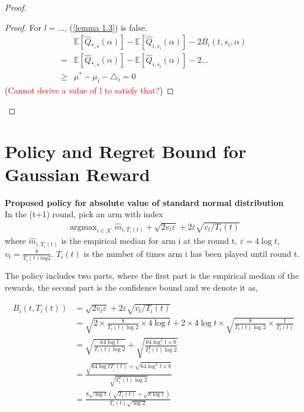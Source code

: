 \documentclass{article}
\DeclareMathOperator*{\argmax}{argmax}
\theoremstyle{plain}
\begin{document}
\begin{proof}
\begin{proof}
    For $l = ...$, (\ref{lemma 1.3}) is false.
    \begin{align}
        & \mathbb{E}[\hat{Q}_{*, s}(\alpha)] - \mathbb{E}[\hat{Q}_{i, s_i}(\alpha)] - 2 B_i(t, s_i, \alpha) \\
        = &\mathbb{E}[\hat{Q}_{*, s}(\alpha)] - \mathbb{E}[\hat{Q}_{i, s_i}(\alpha)] - 2 ... \\
        \geq & \mu^\ast - \mu_i - \triangle_i = 0
    \end{align}
    (\textcolor{red}{Cannot derive a value of l to satisfy that?})
\end{proof}
   
\end{proof}


\section{Policy and Regret Bound for Gaussian Reward}

\textbf{Proposed policy for absolute value of standard normal distribution}\\
In the (t+1) round, pick an arm with index 
\begin{align}
\label{policy normal}
   \argmax_{i \in \mathcal{K}} \hat{m}_{i, T_i(t)} + \sqrt{2v_t \varepsilon} + 2 \varepsilon \sqrt{v_t/T_i(t)}
\end{align}
where $\hat{m}_{i, T_i(t)}$ is the empirical median for arm i at the round t, $\varepsilon = 4 \log t$, $v_t = \frac{8}{T_i(t) log2}$. $T_i(t)$ is the number of times arm i has been played until round t.  

The policy includes two parts, where the first part is the empirical median of the rewards, the second part is the confidence bound and we denote it as,

\begin{align}
\label{B_i(i, T_i(t)) definition}
B_i(t, T_i(t)) &= \sqrt{2v_t \varepsilon} + 2 \varepsilon \sqrt{v_t/T_i(t)}\\
&= \sqrt{2 \times \frac{8}{T_i(t) \log 2} \times 4 \log t} + 2 \times 4 \log t \times \sqrt{\frac{8}{T_i(t) \log 2} \times \frac{1}{T_i(t)}}\\
&= \sqrt{\frac{64 \log t}{T_i(t) \log 2}} + \sqrt{\frac{64 \log^2 t \times 8}{T_i^2(t) \log 2}}\\
&= \frac{\sqrt{64 \log t T__i(t)} + \sqrt{64 \log^2 t \times 8}}{\sqrt{T_i^2(t) \log 2}}\\
\label{B_i(i, T_i(t)) definition 2}
&= \frac{8 \sqrt{\log t} (\sqrt{ T_i(t)} + \sqrt{8\log t})}{T_i(t)  \sqrt{\log 2}}
\end{align}
\end{document}
